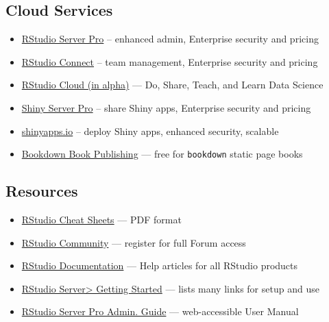 \documentclass[]{book}
\providecommand{\tightlist}{%
  \setlength{\itemsep}{0pt}\setlength{\parskip}{0pt}}
\theoremstyle{definition}
\theoremstyle{definition}
\theoremstyle{definition}
\theoremstyle{remark}
\begin{document}
\hypertarget{cloud-services}{%
\subsection{Cloud Services}\label{cloud-services}}

\begin{itemize}
\tightlist
\item
  \href{https://www.rstudio.com/products/rstudio-server-pro/}{RStudio
  Server Pro} -- enhanced admin, Enterprise security and pricing
\item
  \href{https://www.rstudio.com/products/connect/}{RStudio Connect} --
  team management, Enterprise security and pricing
\item
  \href{https://rstudio.cloud/}{RStudio Cloud (in alpha)} --- Do, Share,
  Teach, and Learn Data Science
\item
  \href{https://www.rstudio.com/products/shiny-server-pro/}{Shiny Server
  Pro} -- share Shiny apps, Enterprise security and pricing
\item
  \href{https://www.rstudio.com/products/shinyapps/}{shinyapps.io} --
  deploy Shiny apps, enhanced security, scalable
\item
  \href{https://bookdown.org/}{Bookdown Book Publishing} --- free for
  \texttt{bookdown} static page books
\end{itemize}

\hypertarget{resources}{%
\subsection{Resources}\label{resources}}

\begin{itemize}
\tightlist
\item
  \href{https://www.rstudio.com/resources/cheatsheets/}{RStudio Cheat
  Sheets} --- PDF format
\item
  \href{https://community.rstudio.com/}{RStudio Community} --- register
  for full Forum access
\item
  \href{https://support.rstudio.com/hc/en-us/categories/200035113-Documentation}{RStudio
  Documentation} --- Help articles for all RStudio products
\item
  \href{https://support.rstudio.com/hc/en-us/articles/234653607-Getting-Started-with-RStudio-Server}{RStudio
  Server\textgreater{} Getting Started} --- lists many links for setup
  and use
\item
  \href{http://docs.rstudio.com/ide/server-pro/}{RStudio Server Pro
  Admin. Guide} --- web-accessible User Manual
\end{itemize}
\end{document}
